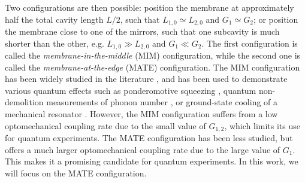 Two configurations are then possible: position the membrane at approximately half the total cavity length \(L/2\), such that \(L_{1,0} \simeq L_{2,0}\) and \(G_1 \simeq G_2\); or position the membrane close to one of the mirrors, such that one subcavity is much shorter than the other, e.g. \(L_{1,0} \gg L_{2,0}\) and \(G_1 \ll G_2\). The first configuration is called the \emph{membrane-in-the-middle} (MIM) configuration, while the second one is called the \emph{membrane-at-the-edge} (MATE) configuration. The MIM configuration has been widely studied in the literature \cite{jayich_dispersive_2008, thompson_strong_2008, sankey_strong_2010, xu_cavity_2016}, and has been used to demonstrate various quantum effects such as ponderomotive squeezing \cite{purdy_observation_2013}, quantum non-demolition measurements of phonon number \cite{sankey_strong_2010}, or ground-state cooling of a mechanical resonator \cite{peterson_laser_2016}. However, the MIM configuration suffers from a low optomechanical coupling rate due to the small value of \(G_{1,2}\), which limits its use for quantum experiments. The MATE configuration has been less studied, but offers a much larger optomechanical coupling rate due to the large value of \(G_1\). This makes it a promising candidate for quantum experiments. In this work, we will focus on the MATE configuration.












































